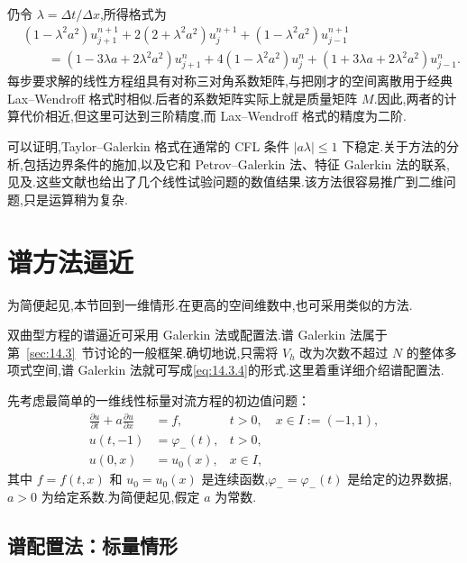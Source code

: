 仍令 \(\lambda=\Delta t/\Delta x\),所得格式为
\begin{equation}\label{eq:14.3.27}
  \begin{aligned}
    &(1-\lambda^2a^2)u_{j+1}^{n+1}
        +2(2+\lambda^2a^2)u_j^{n+1}+(1-\lambda^2a^2)u_{j-1}^{n+1}\\
    &\qquad=(1-3\lambda a+2\lambda^2a^2)u_{j+1}^n
           +4(1-\lambda^2a^2)u_j^n+(1+3\lambda a+2\lambda^2a^2)u_{j-1}^n.
  \end{aligned}
\end{equation}
每步要求解的线性方程组具有对称三对角系数矩阵,与把刚才的空间离散用于经典 Lax--Wendroff 格式时相似.后者的系数矩阵实际上就是质量矩阵 \(M\).因此,两者的计算代价相近,但这里可达到三阶精度,而 Lax--Wendroff 格式的精度为二阶.

可以证明,Taylor--Galerkin 格式在通常的 CFL 条件 \(|a\lambda|\le1\) 下稳定.关于方法的分析,包括边界条件的施加,以及它和 Petrov--Galerkin 法、特征 Galerkin 法的联系,见及.这些文献也给出了几个线性试验问题的数值结果.该方法很容易推广到二维问题,只是运算稍为复杂.

\section{谱方法逼近}\label{sec:14.4}

为简便起见,本节回到一维情形.在更高的空间维数中,也可采用类似的方法.

双曲型方程的谱逼近可采用 Galerkin 法或配置法.谱 Galerkin 法属于第~\ref{sec:14.3}~节讨论的一般框架.确切地说,只需将 \(V_h\) 改为次数不超过 \(N\) 的整体多项式空间,谱 Galerkin 法就可写成\eqref{eq:14.3.4}的形式.这里着重详细介绍谱配置法.

先考虑最简单的一维线性标量对流方程的初边值问题：
\begin{align}
  \frac{\partial u}{\partial t}+a\frac{\partial u}{\partial x}&=f,
     & t>0,\quad x\in I:=(-1,1),\label{eq:14.4.1}\\
  u(t,-1)&=\varphi_-(t), & t>0,\label{eq:14.4.2}\\
  u(0,x)&=u_0(x), & x\in I,\label{eq:14.4.3}
\end{align}
其中 \(f=f(t,x)\) 和 \(u_0=u_0(x)\) 是连续函数,\(\varphi_-=\varphi_-(t)\) 是给定的边界数据,\(a>0\) 为给定系数.为简便起见,假定 \(a\) 为常数.

\subsection{谱配置法：标量情形}\label{sec:14.4.1}

